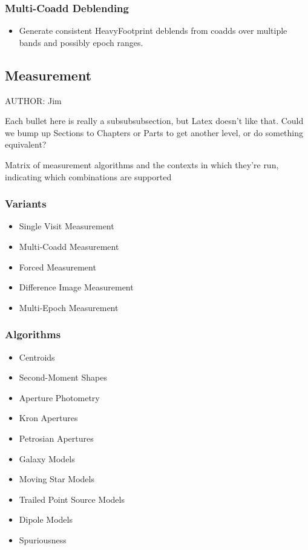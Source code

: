 \subsubsection{Multi-Coadd Deblending}
\begin{itemize}
\item Generate consistent HeavyFootprint deblends from coadds over multiple bands and possibly epoch ranges.
\end{itemize}

\subsection{Measurement}
AUTHOR: Jim
\begin{note}[NOTE]
Each bullet here is really a subsubsubsection, but Latex doesn't like that.  Could we bump up Sections to Chapters or Parts to get another level, or do something equivalent?
\end{note}

\begin{note}
Matrix of measurement algorithms and the contexts in which they're run, indicating which combinations are supported
\end{note}

\subsubsection{Variants}
\begin{itemize}
\item Single Visit Measurement
\item Multi-Coadd Measurement
\item Forced Measurement
\item Difference Image Measurement
\item Multi-Epoch Measurement
\end{itemize}
\subsubsection{Algorithms}
\begin{itemize}
\item Centroids
\item Second-Moment Shapes
\item Aperture Photometry
\item Kron Apertures
\item Petrosian Apertures
\item Galaxy Models
\item Moving Star Models
\item Trailed Point Source Models
\item Dipole Models
\item Spuriousness
\end{itemize}

